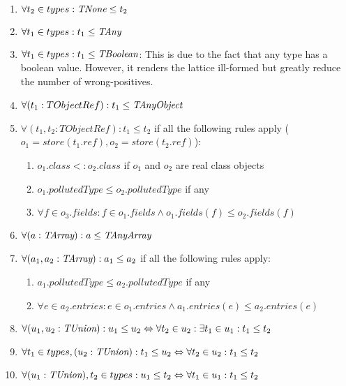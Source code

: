 \documentclass[a4paper]{article}
\begin{document}
\begin{enumerate}
  \item $\forall t_2 \in types : \emph{TNone} \leq t_2$
  \item $\forall t_1 \in types : t_1 \leq \emph{TAny}$
  \item $\forall t_1 \in types : t_1 \leq \emph{TBoolean}$: This is due to the fact
    that any type has a boolean value. However, it renders the lattice
    ill-formed but greatly reduce the number of wrong-positives.
  \item $\forall (t_1:  TObjectRef): t_1 \leq \emph{TAnyObject}$
  \item $\forall (t_1,t_2: TObjectRef): t_1 \leq t_2$
    if all the following rules apply ($o_1 = store(t_1.ref), o_2 = store(t_2.ref)$):
    \begin{enumerate}
        \item $o_1.class <: o_2.class$ if $o_1$ and $o_2$ are real class objects
        \item $o_1.pollutedType \leq o_2.pollutedType$ if any
        \item $\forall f \in o_3.fields: f \in o_1.fields \wedge o_1.fields(f)
          \leq o_2.fields(f)$
    \end{enumerate}
  \item $\forall (a: \emph{TArray}) : a \leq \emph{TAnyArray}$
  \item $\forall (a_1,a_2: \emph{TArray}) : a_1 \leq a_2$
    if all the following rules apply:
    \begin{enumerate}
        \item $a_1.pollutedType \leq a_2.pollutedType$ if any
        \item $\forall e \in a_2.entries: e \in o_1.entries \wedge a_1.entries(e)
          \leq a_2.entries(e)$
    \end{enumerate}
  \item $\forall (u_1,u_2: \emph{TUnion}) : u_1 \leq u_2 \Leftrightarrow \forall t_2 \in u_2: \exists t_1 \in u_1: t_1 \leq t_2$
  \item $\forall t_1 \in types, (u_2: \emph{TUnion}) : t_1 \leq u_2 \Leftrightarrow \forall t_2 \in u_2: t_1 \leq t_2$
  \item $\forall (u_1: \emph{TUnion}), t_2 \in types : u_1 \leq t_2 \Leftrightarrow \forall t_1 \in u_1: t_1 \leq t_2$
\end{enumerate}
\end{document}
